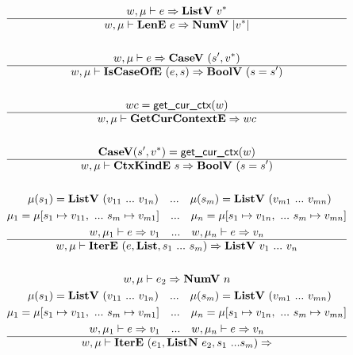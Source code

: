 \begin{gather*}
%
\newline \\
  w, \mu \vdash e \Rightarrow \listv ~ \seq{v} \\
  \hline
  w, \mu \vdash \lene ~ e \Rightarrow \numv ~ |\seq v| \\
%
\newline \\
  w, \mu \vdash e \Rightarrow \casev ~ (s', \seq{v}) \\
  \hline
  w, \mu \vdash \iscaseofe ~ (e, s) \Rightarrow \boolv ~ (s = s') \\
%
\newline \\
  wc = \getcurctx(w) \\
  \hline
  w, \mu \vdash \getcurctxe \Rightarrow wc \\
%
\newline \\
  \casev (s', \seq v) = \getcurctx(w) \\
  \hline
  w, \mu \vdash \ctxkinde ~ s \Rightarrow \boolv ~ (s = s') \\
%
\newline \\
  \,~\mu(s_1) = \listv ~ (v_{11} ~ ... ~ v_{1n}) \quad ... \quad
  \mu(s_m) = \listv ~ (v_{m1} ~ ... ~ v_{mn}) \\
  \mu_1 = \mu[s_1 \mapsto v_{11}, ~ ... ~ s_m \mapsto v_{m1}] \quad ... \quad
  \mu_n = \mu[s_1 \mapsto v_{1n}, ~ ... ~ s_m \mapsto v_{mn}] \\
  w, \mu_1 \vdash e \Rightarrow v_1 \quad ... \quad
  w, \mu_n \vdash e \Rightarrow v_n \\
  \hline
  w, \mu \vdash \itere ~ (e, \listiter, s_1 ~ ... ~ s_m) \Rightarrow
  \listv ~ v_1 ~ ... ~ v_n \\
%
\newline \\
  w, \mu \vdash e_2 \Rightarrow \numv ~ n \\
  \,~\mu(s_1) = \listv ~ (v_{11} ~ ... ~ v_{1n}) \quad ... \quad
  \mu(s_m) = \listv ~ (v_{m1} ~ ... ~ v_{mn}) \\
  \mu_1 = \mu[s_1 \mapsto v_{11}, ~ ... ~ s_m \mapsto v_{m1}] \quad ... \quad
  \mu_n = \mu[s_1 \mapsto v_{1n}, ~ ... ~ s_m \mapsto v_{mn}] \\
  w, \mu_1 \vdash e \Rightarrow v_1 \quad ... \quad
  w, \mu_n \vdash e \Rightarrow v_n \\
  \hline
  w, \mu \vdash \itere ~ (e_1, \listniter ~ e_2, s_1 ~ ... s_m) \Rightarrow

\end{gather*}
